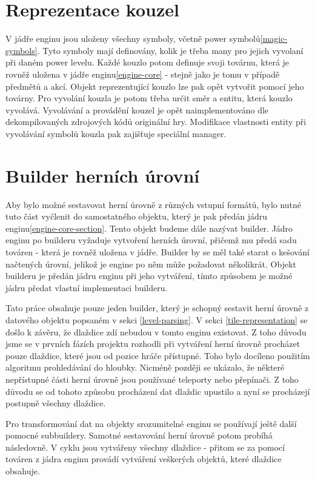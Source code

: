 \section{Reprezentace kouzel}
V jádře enginu jsou uloženy všechny symboly, včetně power symbolů\vref{magic-symbols}.
Tyto symboly mají definovány, kolik je třeba many pro jejich vyvolaní při daném power levelu.
Každé kouzlo potom definuje svoji továrnu, která je rovněž uložena v jádře enginu\vref{engine-core} - stejně jako je tomu v případě předmětů a akcí.
Objekt reprezentující kouzlo lze pak opět vytvořit pomocí jeho továrny. Pro vyvolání kouzla je potom třeba určit směr a entitu,
která kouzlo vyvolává. Vyvolávání a provádění kouzel je opět naimplementováno dle dekompilovaných
zdrojových kódů\cite{DMDecompilation} originální hry. Modifikace vlastnosti entity při vyvolávání symbolů
kouzla pak zajišťuje speciální manager. 

\section{Builder herních úrovní}

Aby bylo možné sestavovat herní úrovně z různých vstupní formátů, bylo nutné tuto část vyčlenit do samostatného
objektu, který je pak předán jádru enginu\vref{engine-core-section}. Tento objekt budeme dále nazývat builder. Jádro enginu
po builderu vyžaduje vytvoření herních úrovní, přičemž mu předá sadu továren - která je rovněž uložena v jádře. Builder
by se měl také starat o kešování načtených úrovní, jelikož je engine po něm může požadovat několikrát. Objekt builderu
je předán jádru enginu při jeho vytváření, tímto způsobem je možné jádru předat vlastní implementaci builderu.

Tato práce obsahuje pouze jeden builder, který je schopný sestavit herní úrovně z datového objektu popsaném v sekci \ref{level-parsing}.
V sekci \ref{tile-representation} se došlo k závěru, že dlaždice zdí nebudou v tomto enginu existovat. Z toho důvodu jsme se 
v prvních fázích projektu rozhodli při vytváření herní úrovně procházet pouze dlaždice, které jsou od pozice hráče přístupné.
Toho bylo docíleno použitím algoritmu prohledávání do hloubky. Nicméně později se ukázalo, že některé nepřístupné části herní úrovně
jsou používané teleporty nebo přepínači. Z toho důvodu se od tohoto způsobu procházení dat dlaždic upustilo a nyní se procházejí 
postupně všechny dlaždice.

Pro transformování dat na objekty srozumitelné enginu se používají ještě další pomocné subbuildery. 
Samotné sestavování herní úrovně potom probíhá následovně. V cyklu jsou vytvářeny všechny dlaždice - přitom se za pomocí továren 
z jádra enginu provádí vytváření veškerých objektů, které dlaždice obsahuje.

